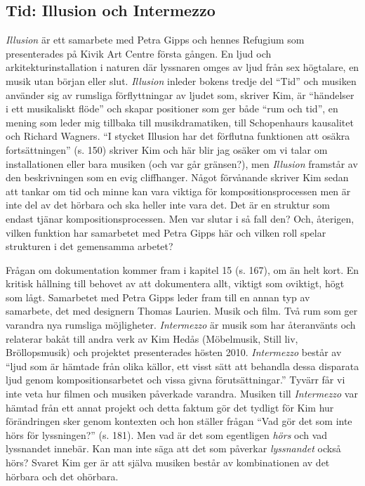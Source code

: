 \documentclass[a4paper]{article}
\begin{document}
\subsection*{Tid: Illusion och Intermezzo}

\emph{Illusion} är ett samarbete med Petra Gipps och hennes Refugium som presenterades på Kivik Art Centre första gången. En ljud och arkitekturinstallation i naturen där lyssnaren omges av ljud från sex högtalare, en musik utan början eller slut. \emph{Illusion} inleder bokens tredje del ``Tid'' och musiken använder sig av rumsliga förflyttningar av ljudet som, skriver Kim, är ``händelser i ett musikaliskt flöde'' och skapar positioner som ger både ``rum och tid'', en mening som leder mig tillbaka till musikdramatiken, till Schopenhaurs kausalitet och Richard Wagners. ``I stycket Illusion har det förflutna funktionen att osäkra fortsättningen'' (s. 150) skriver Kim och här blir jag osäker om vi talar om installationen eller bara musiken (och var går gränsen?), men \emph{Illusion} framstår av den beskrivningen som en evig cliffhanger. Något förvånande skriver Kim sedan att tankar om tid och minne kan vara viktiga för kompositionsprocessen men är inte del av det hörbara och ska heller inte vara det. Det är en struktur som endast tjänar kompositionsprocessen. Men var slutar i så fall den? Och, återigen, vilken funktion har samarbetet med Petra Gipps här och vilken roll spelar strukturen i det gemensamma arbetet?


Frågan om dokumentation kommer fram i kapitel 15 (s. 167), om än helt kort. En kritisk hållning till behovet av att dokumentera allt, viktigt som oviktigt, högt som lågt. Samarbetet med Petra Gipps leder fram till en annan typ av samarbete, det med designern Thomas Laurien. Musik och film. Två rum som ger varandra nya rumsliga möjligheter. \emph{Intermezzo} är musik som har återanvänts och relaterar bakåt till andra verk av Kim Hedås (Möbelmusik, Still liv, Bröllopsmusik) och projektet presenterades hösten 2010. \emph{Intermezzo} består av ``ljud som är hämtade från olika källor, ett visst sätt att behandla dessa disparata ljud genom kompositionsarbetet och vissa givna förutsättningar.'' Tyvärr får vi inte veta hur filmen och musiken påverkade varandra. Musiken till \emph{Intermezzo} var hämtad från ett annat projekt och detta faktum gör det tydligt för Kim hur förändringen sker genom kontexten och hon ställer frågan ``Vad gör det som inte hörs för lyssningen?'' (s. 181). Men vad är det som egentligen \emph{hörs} och vad lyssnandet innebär. Kan man inte säga att det som påverkar \emph{lyssnandet} också hörs? Svaret Kim ger är att själva musiken består av kombinationen av det hörbara och det ohörbara.
\end{document}
